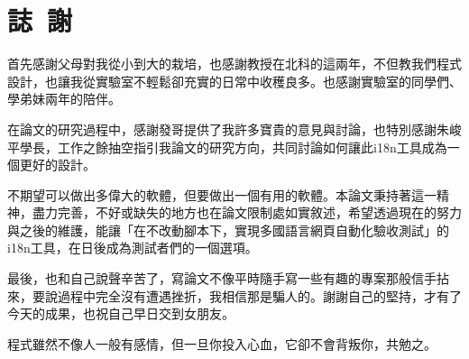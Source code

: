 \chapter*{誌~謝~}

首先感謝父母對我從小到大的栽培，也感謝教授在北科的這兩年，不但教我們程式設計，也讓我從實驗室不輕鬆卻充實的日常中收穫良多。也感謝實驗室的同學們、學弟妹兩年的陪伴。

在論文的研究過程中，感謝發哥提供了我許多寶貴的意見與討論，也特別感謝朱峻平學長，工作之餘抽空指引我論文的研究方向，共同討論如何讓此i18n工具成為一個更好的設計。

不期望可以做出多偉大的軟體，但要做出一個有用的軟體。本論文秉持著這一精神，盡力完善，不好或缺失的地方也在論文限制處如實敘述，希望透過現在的努力與之後的維護，能讓「在不改動腳本下，實現多國語言網頁自動化驗收測試」的i18n工具，在日後成為測試者們的一個選項。

最後，也和自己說聲辛苦了，寫論文不像平時隨手寫一些有趣的專案那般信手拈來，要說過程中完全沒有遭遇挫折，我相信那是騙人的。謝謝自己的堅持，才有了今天的成果，也祝自己早日交到女朋友。

程式雖然不像人一般有感情，但一旦你投入心血，它卻不會背叛你，共勉之。
